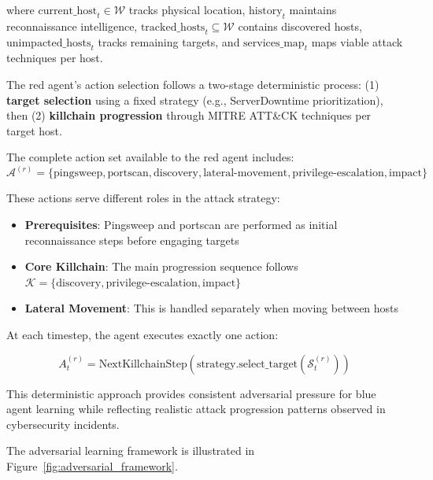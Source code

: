 \documentclass[12pt,oneside]{article}
\begin{document}
where $\text{current\_host}_t \in \mathcal{W}$ tracks physical location, $\text{history}_t$ maintains reconnaissance intelligence, $\text{tracked\_hosts}_t \subseteq \mathcal{W}$ contains discovered hosts, $\text{unimpacted\_hosts}_t$ tracks remaining targets, and $\text{services\_map}_t$ maps viable attack techniques per host.

The red agent's action selection follows a two-stage deterministic process: (1) \textbf{target selection} using a fixed strategy (e.g., ServerDowntime prioritization), then (2) \textbf{killchain progression} through MITRE ATT\&CK techniques per target host.

The complete action set available to the red agent includes:
$$\mathcal{A}^{(r)} = \{\text{pingsweep}, \text{portscan}, \text{discovery}, \text{lateral-movement}, \text{privilege-escalation}, \text{impact}\}$$

These actions serve different roles in the attack strategy:
\begin{itemize}
\item \textbf{Prerequisites}: Pingsweep and portscan are performed as initial reconnaissance steps before engaging targets
\item \textbf{Core Killchain}: The main progression sequence follows $\mathcal{K} = \{\text{discovery}, \text{privilege-escalation}, \text{impact}\}$  
\item \textbf{Lateral Movement}: This is handled separately when moving between hosts
\end{itemize}

At each timestep, the agent executes exactly one action:

\begin{equation}
A_t^{(r)} = \text{NextKillchainStep}(\text{strategy.select\_target}(\mathcal{S}^{(r)}_t))
\end{equation}

This deterministic approach provides consistent adversarial pressure for blue agent learning while reflecting realistic attack progression patterns observed in cybersecurity incidents.

The adversarial learning framework is illustrated in Figure~\ref{fig:adversarial_framework}.
\end{document}

